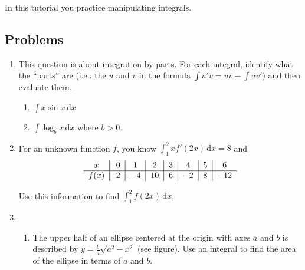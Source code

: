 	\begin{objectives}
        In this tutorial you practice manipulating integrals.
	\end{objectives}

		\vspace{-.5em}
		\subsection*{Problems}
		\vspace{-.5em}


\begin{enumerate}
    \item This question is about integration by parts. For each integral, identify what the ``parts'' are (i.e., the $u$ and $v$ in the formula
    $\displaystyle \int u'v = uv-\int uv'$) and then evaluate them.
    \begin{enumerate}
        \item $\displaystyle \int x\sin x\,\mathrm d x$
        \item $\displaystyle\int\log_b x\,\mathrm d x$ where $b>0$.
    \end{enumerate}
    \item 
    For an unknown function $f$, you know $\displaystyle\int_1^2 xf'(2x)\,\mathrm d x=8$ and 
    	\begin{align*}
    	    \hfill\begin{tabular}{c||c|c|c|c|c|c|c}
            $x$&$0$&$1$&$2$&$3$&$4$&$5$&$6$\\
            \hline
            $f(x)$&$2$&$-4$&$10$&$6$&$-2$&$8$&$-12$
            \end{tabular}\hfill\null
    	\end{align*}

        Use this information to find $\displaystyle\int_1^2 f(2x)\,\mathrm d x$.

    \item \phantom{x}
    \begin{enumerate}

        \item \phantom{x}
        
        \begin{minipage}{0.5\textwidth}
        The upper half of an ellipse centered at the origin with axes $a$ and $b$ is described by $y = \frac{b}{a}\sqrt{a^2-x^2}$ (see figure). Use an integral to find the area of the ellipse in terms of $a$ and $b$.


\end{minipage}
\end{enumerate}
\end{enumerate}
